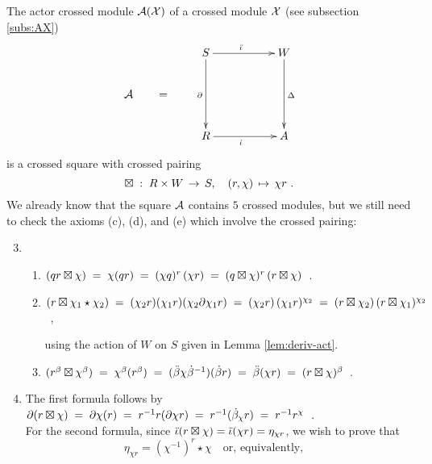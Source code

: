 \begin{example} \label{ex:actor-square} 
The actor crossed module $\mathcal{A}(\mathcal{X})$ of a crossed module $\mathcal{X}$ 
(see subsection \ref{subs:AX}) 
\begin{equation} \label{eq:actor}
\vcenter{\xymatrix{ 
               &  S \ar[rr]^(0.45){\ddi} \ar[dd]_{\partial}
                  &&  W \ar[dd]^{\Delta}  \\
\calA \qquad =  &     &&  \\
               &  R \ar[rr]_(0.45){\di}
                  &&  A
}} 
\end{equation}
is a crossed square with crossed pairing 
$$
\boxtimes \;:\;  R \times W \,\to\, S, \quad
(r,\chi) \,\mapsto\, \chi r~.
$$
We already know that the square  $\mathcal{A}$  contains $5$ crossed modules,
but we still need to check the axioms (c), (d), and (e) 
which involve the crossed pairing: 
\begin{enumerate}[{\rm (a)}]
\setcounter{enumi}{2}
\item
 \begin{enumerate}[{\rm (i)}]
 \item
  $(qr \boxtimes \chi) 
  \;=\; \chi(qr)
  \;=\; (\chi q)^r\,(\chi r)
  \;=\; (q \boxtimes \chi)^r\,(r \boxtimes \chi)$~.
 \item
  $(r \boxtimes \chi_1\star\chi_2)
  \;=\; (\chi_2 r)(\chi_1 r)(\chi_2\partial\chi_1 r)
  \;=\; (\chi_2 r)\,(\chi_1 r)^{\chi_2}
  \;=\; (r \boxtimes \chi_2)\,(r \boxtimes \chi_1)^{\chi_2}$~,
  \begin{flushright}
    using the action of $W$ on $S$ given in Lemma \ref{lem:deriv-act}. 
  \end{flushright}
 \item
  $(r^{\beta} \boxtimes \chi^{\beta})
   \; = \; \chi^{\beta}(r^{\beta}) 
   \; = \; (\ddot{\beta} \chi \dot{\beta}^{-1})(\dot{\beta} r) 
   \; = \; \ddot{\beta}(\chi r) 
   \; = \; (r \boxtimes \chi)^{\beta}$~.
 \end{enumerate}
\item
The first formula follows by\\
\hspace*{4mm}$\partial (r \boxtimes \chi) 
  \;=\; \partial \chi(r) 
  \;=\; r^{-1} r (\partial \chi r) 
  \;=\; r^{-1} (\dot{\beta}_{\chi} r) 
  \;=\; r^{-1} r^{\chi}$~.\\ 
For the second formula, 
since $\ddot{\iota}(r \boxtimes \chi) = \ddot{\iota}(\chi r) = \eta_{\chi r}$, we wish to prove that
$$
\eta_{\chi r} = (\chi^{-1})^r \star \chi
\quad\mbox{or, equivalently,}\quad
$$
\end{enumerate}
\end{example}
